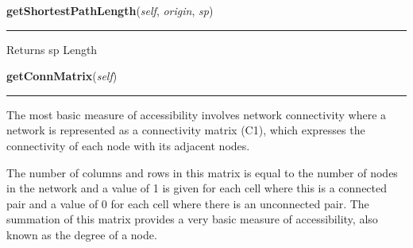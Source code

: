     \label{Epigrass:simobj:graph:getShortestPathLength}

    \vspace{0.5ex}

    \begin{boxedminipage}{\textwidth}

    \raggedright \textbf{getShortestPathLength}(\textit{self}, \textit{origin}, \textit{sp})

    \vspace{-1.5ex}

    \rule{\textwidth}{0.5\fboxrule}
    Returns sp Length

    \vspace{1ex}

    \end{boxedminipage}

    \label{Epigrass:simobj:graph:getConnMatrix}

    \vspace{0.5ex}

    \begin{boxedminipage}{\textwidth}

    \raggedright \textbf{getConnMatrix}(\textit{self})

    \vspace{-1.5ex}

    \rule{\textwidth}{0.5\fboxrule}
    The most basic measure of accessibility involves network connectivity 
    where a network is represented as a  connectivity matrix (C1), which 
    expresses the connectivity of each node with its adjacent nodes.

    The number of columns and rows in this matrix is equal to the number of
    nodes in the network and a value of 1 is given for each cell where this
    is a connected pair and a value of 0 for each cell where there is an 
    unconnected pair. The summation of this matrix provides a very basic 
    measure of accessibility, also known as the degree of a node.

    \vspace{1ex}

    \end{boxedminipage}

